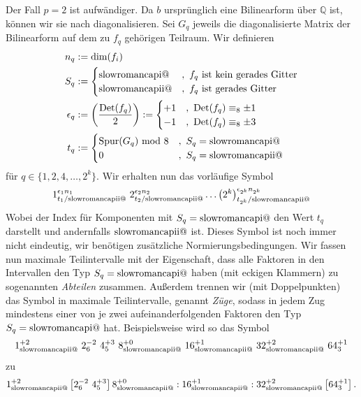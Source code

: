 \documentclass[12pt,a4paper,halfparskip,headsepline,bibtotocnumbered]{scrreprt}
\makeatletter
\theoremstyle{nummermitklammern}
\theoremstyle{nonumberbreak}
\newcommand{\Q}{\mathbb{Q}}
\newcommand{\Det}{\text{Det}}
\renewcommand{\i}{\text{\expandafter\@slowromancap\romannumeral 1@}}
\newcommand{\ii}{\text{\expandafter\@slowromancap\romannumeral 2@}}
\makeatother
\begin{document}
Der Fall $p=2$ ist aufwändiger. Da $b$ ursprünglich eine Bilinearform über $\Q$ ist, können wir sie nach \cite[Satz (1.20)]{kneser} diagonalisieren. Sei $G_q$ jeweils die diagonalisierte Matrix der Bilinearform auf dem zu $f_q$ gehörigen Teilraum. Wir definieren
\begin{align*}
	n_q &:= \text{dim}(f_i)\\
	S_q &:= \begin{cases} \i&,\ f_q \text{ ist kein gerades Gitter}\\ \ii &,\ f_q \text{ ist gerades Gitter} \end{cases}\\
	\epsilon_q &:= \left( \frac{\Det(f_q)}{2} \right) := \begin{cases} +1 &,\ \Det(f_q) \equiv_8 \pm 1\\ -1 &,\ \Det(f_q) \equiv_8 \pm 3 \end{cases}\\
	t_q &:= \begin{cases} \text{Spur}(G_q) \text{ mod } 8 &,\ S_q = \i\\ 0 &,\ S_q = \ii\end{cases}
\end{align*}
für $q \in \lbrace 1, 2, 4, \dots, 2^k \rbrace$. Wir erhalten nun das vorläufige Symbol
\begin{equation*}
	1_{t_1 / \ii}^{\epsilon_1 n_1}\ 2_{t_2 / \ii}^{\epsilon_2 n_2} \dots \left( 2^k \right)_{t_{2^k} / \ii}^{\epsilon_{2^k} n_{2^k}}
\end{equation*}
Wobei der Index für Komponenten mit $S_q = \i$ den Wert $t_q$ darstellt und andernfalls $\ii$ ist. Dieses Symbol ist noch immer nicht eindeutig, wir benötigen zusätzliche Normierungsbedingungen. Wir fassen nun maximale Teilintervalle mit der Eigenschaft, dass alle Faktoren in den Intervallen den Typ $S_q = \i$ haben (mit eckigen Klammern) zu sogenannten \textit{Abteilen} zusammen. Außerdem trennen wir (mit Doppelpunkten) das Symbol in maximale Teilintervalle, genannt \textit{Züge}, sodass in jedem Zug mindestens einer von je zwei aufeinanderfolgenden Faktoren den Typ $S_q = \i$ hat. Beispielsweise wird so das Symbol
\begin{equation}\label{symbol}
	1_{\ii}^{+2}\ 2_6^{-2}\ 4_5^{+3}\ 8_{\ii}^{+0}\ 16_{\ii}^{+1}\ 32_{\ii}^{+2}\ 64_{3}^{+1}
\end{equation}
zu
\begin{equation*}
	1_{\ii}^{+2} \left[ 2_6^{-2}\ 4_5^{+3} \right] 8_{\ii}^{+0} : 16_{\ii}^{+1} : 32_{\ii}^{+2} \left[ 64_{3}^{+1} \right].
\end{equation*}
\end{document}

